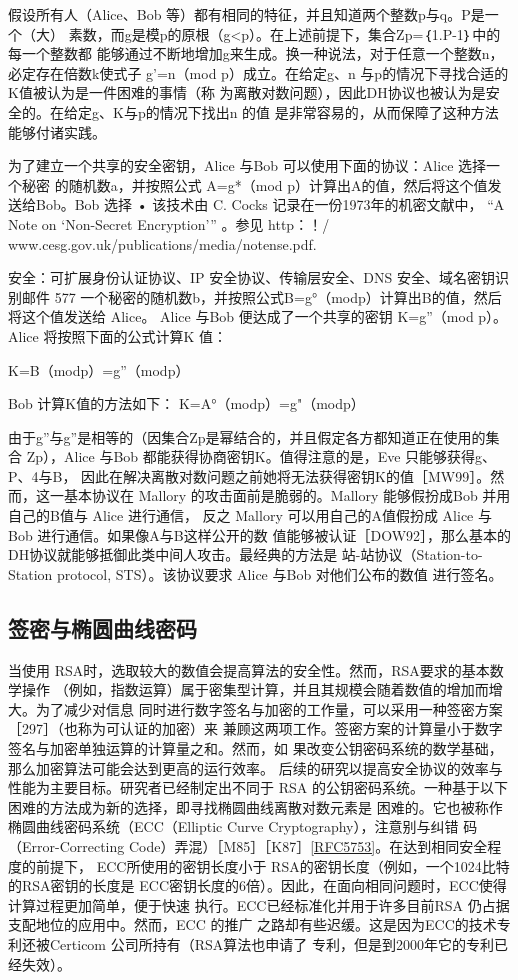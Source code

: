 假设所有人（Alice、Bob 等）都有相同的特征，并且知道两个整数p与q。P是一个（大）
素数，而g是模p的原根（g<p）。在上述前提下，集合Zp=｛1.P-1｝中的每一个整数都
能够通过不断地增加g来生成。换一种说法，对于任意一个整数n，必定存在倍数k使式子
g'=n（mod p）成立。在给定g、n 与p的情况下寻找合适的K值被认为是一件困难的事情（称
为离散对数问题），因此DH协议也被认为是安全的。在给定g、K与p的情况下找出n 的值
是非常容易的，从而保障了这种方法能够付诸实践。

为了建立一个共享的安全密钥，Alice 与Bob 可以使用下面的协议：Alice 选择一个秘密
的随机数a，并按照公式 A=g*（mod p）计算出A的值，然后将这个值发送给Bob。Bob 选择
• 该技术由 C. Cocks 记录在一份1973年的机密文献中，
“A Note on ‘Non-Secret Encryption’”
。参见 http：！/
www.cesg.gov.uk/publications/media/notense.pdf.

安全：可扩展身份认证协议、IP 安全协议、传输层安全、DNS 安全、域名密钥识别邮件 577
一个秘密的随机数b，并按照公式B=g°（modp）计算出B的值，然后将这个值发送给 Alice。
Alice 与Bob 便达成了一个共享的密钥 K=g”（mod p）。Alice 将按照下面的公式计算K 值：

K=B（modp）=g”（modp）

Bob 计算K值的方法如下：
K=A°（modp）=g"（modp）

由于g”与g”是相等的（因集合Zp是幂结合的，并且假定各方都知道正在使用的集
合 Zp），Alice 与Bob 都能获得协商密钥K。值得注意的是，Eve 只能够获得g、P、4与B，
因此在解决离散对数问题之前她将无法获得密钥K的值［MW99］。然而，这一基本协议在
Mallory 的攻击面前是脆弱的。Mallory 能够假扮成Bob 并用自己的B值与 Alice 进行通信，
反之 Mallory 可以用自己的A值假扮成 Alice 与Bob 进行通信。如果像A与B这样公开的数
值能够被认证［DOW92］，那么基本的DH协议就能够抵御此类中间人攻击。最经典的方法是
站-站协议（Station-to-Station protocol, STS）。该协议要求 Alice 与Bob 对他们公布的数值
进行签名。

\subsection{签密与椭圆曲线密码}
当使用 RSA时，选取较大的数值会提高算法的安全性。然而，RSA要求的基本数学操作
（例如，指数运算）属于密集型计算，并且其规模会随着数值的增加而增大。为了减少对信息
同时进行数字签名与加密的工作量，可以采用一种签密方案［297］（也称为可认证的加密）来
兼顾这两项工作。签密方案的计算量小于数字签名与加密单独运算的计算量之和。然而，如
果改变公钥密码系统的数学基础，那么加密算法可能会达到更高的运行效率。
后续的研究以提高安全协议的效率与性能为主要目标。研究者已经制定出不同于 RSA
的公钥密码系统。一种基于以下困难的方法成为新的选择，即寻找椭圆曲线离散对数元素是
困难的。它也被称作椭圆曲线密码系统（ECC（Elliptic Curve Cryptography），注意别与纠错
码（Error-Correcting Code）弄混）［M85］［K87］\href{https://www.rfc-editor.org/rfc/rfc5753}{[RFC5753]}。在达到相同安全程度的前提下，
ECC所使用的密钥长度小于 RSA的密钥长度（例如，一个1024比特的RSA密钥的长度是
ECC密钥长度的6倍）。因此，在面向相同问题时，ECC使得计算过程更加简单，便于快速
执行。ECC已经标准化并用于许多目前RSA 仍占据支配地位的应用中。然而，ECC 的推广
之路却有些迟缓。这是因为ECC的技术专利还被Certicom 公司所持有（RSA算法也申请了
专利，但是到2000年它的专利已经失效）。
